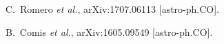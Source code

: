 \begin{thebibliography}{99}
  

  C.~Romero {\it et al.},
  arXiv:1707.06113 [astro-ph.CO].
  
  
  B.~Comis {\it et al.},
  arXiv:1605.09549 [astro-ph.CO].
  
  
 








\end{thebibliography}
